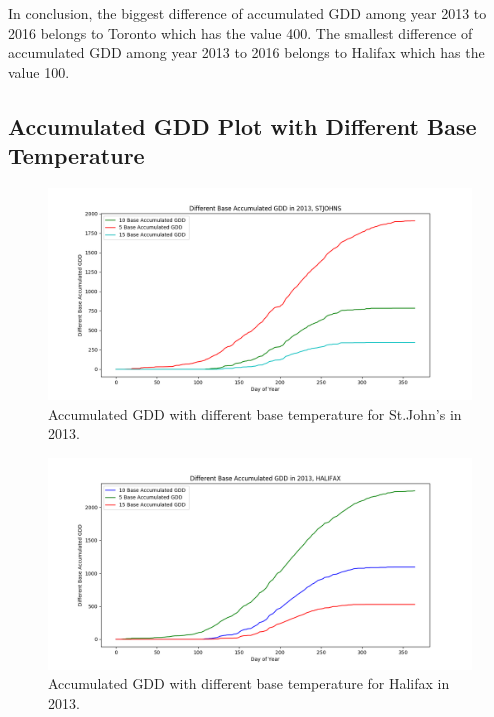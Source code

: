 \documentclass[12pt]{article}
\begin{document}
In conclusion, the biggest difference of accumulated GDD among year 2013 to 2016 belongs to Toronto which has the value 400. The smallest difference of accumulated GDD among year 2013 to 2016 belongs to Halifax which has the value 100.

\subsection{Accumulated GDD Plot with Different Base Temperature}

\begin{center}
\begin{figure}[H]
\includegraphics[width=5.25in]{../Plot/STJOHNS/accGDD_Base_2013.png}
\caption{Accumulated GDD with different base temperature for St.John's in 2013.}
\label{17}
\end{figure}
\end{center}



\begin{center}
\begin{figure}[H]
\includegraphics[width=5.25in]{../Plot/HALIFAX/accGDD_Base_2013.png}

\caption{Accumulated GDD with different base temperature for Halifax in 2013.}
\label{18}
\end{figure}
\end{center}
\end{document}
